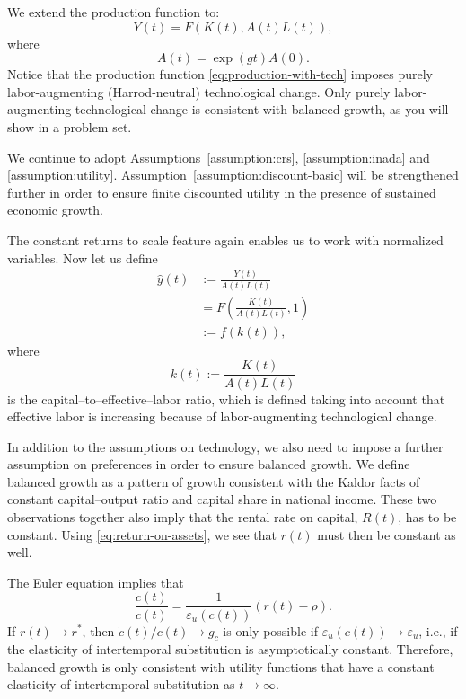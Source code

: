 \documentclass[\topdir/lecture\_notes.tex]{subfiles}
\begin{document}
We extend the production function to:
\begin{equation}
  Y(t)=F(K(t), A(t) L(t)),
  \label{eq:production-with-tech}
\end{equation}
where
\[
  A(t)=\exp(g t) A(0).
\]
Notice that the production function \eqref{eq:production-with-tech} imposes purely labor-augmenting (Harrod-neutral) technological change.
Only purely labor-augmenting technological change is consistent with balanced growth, as you will show in a problem set.

We continue to adopt Assumptions~\ref{assumption:crs}, \ref{assumption:inada} and \ref{assumption:utility}.
Assumption~\ref{assumption:discount-basic} will be strengthened further in order to ensure finite discounted utility in the presence of sustained economic growth.

The constant returns to scale feature again enables us to work with normalized variables.
Now let us define
\[
  \begin{aligned}
    \hat{y}(t) & := \frac{Y(t)}{A(t) L(t)}                \\
               & =F\left(\frac{K(t)}{A(t) L(t)}, 1\right) \\
               & := f(k(t)),
  \end{aligned}
\]
where
\[
  k(t) := \frac{K(t)}{A(t) L(t)}
\]
is the capital--to--effective--labor ratio, which is defined taking into account that effective labor is increasing because of labor-augmenting technological change.

In addition to the assumptions on technology, we also need to impose a further assumption on preferences in order to ensure balanced growth.
We define balanced growth as a pattern of growth consistent with the Kaldor facts of constant capital--output ratio and capital share in national income.
These two observations together also imply that the rental rate on capital, $R(t)$, has to be constant.
Using \eqref{eq:return-on-assets}, we see that $r(t)$ must then be constant as well.

The Euler equation implies that
\[
  \frac{\dot{c}(t)}{c(t)}=\frac{1}{\varepsilon_{u}(c(t))}(r(t)-\rho).
\]
If $r(t) \rightarrow r^{*}$, then $\dot{c}(t) / c(t) \rightarrow g_{c}$ is only possible if $\varepsilon_{u}(c(t)) \rightarrow \varepsilon_{u}$, i.e., if the elasticity of intertemporal substitution is asymptotically constant.
Therefore, balanced growth is only consistent with utility functions that have a constant elasticity of intertemporal substitution as $t \rightarrow \infty$.
\end{document}
